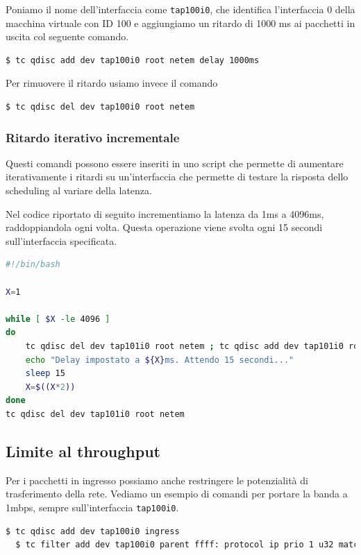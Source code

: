 \documentclass[12pt, hidelinks]{report}
\begin{document}
Poniamo il nome dell'interfaccia come \texttt{tap100i0}, che identifica l'interfaccia 0 della macchina virtuale con ID 100 e aggiungiamo un ritardo di 1000 ms ai pacchetti in uscita col seguente comando.

\begin{lstlisting}[language=bash]
  $ tc qdisc add dev tap100i0 root netem delay 1000ms
\end{lstlisting}

Per rimuovere il ritardo usiamo invece il comando

\begin{lstlisting}[language=bash]
  $ tc qdisc del dev tap100i0 root netem
\end{lstlisting}

\subsubsection{Ritardo iterativo incrementale}
Questi comandi possono essere inseriti in uno script che permette di aumentare iterativamente i ritardi su un'interfaccia che permette di testare la risposta dello scheduling al variare della latenza.

Nel codice riportato di seguito incrementiamo la latenza da 1ms a 4096ms, raddoppiandola ogni volta. Questa operazione viene svolta ogni 15 secondi sull'interfaccia specificata.

\begin{lstlisting}[language=bash]
#!/bin/bash

X=1

while [ $X -le 4096 ]
do
    tc qdisc del dev tap101i0 root netem ; tc qdisc add dev tap101i0 root netem delay ${X}ms rate 1mbit
    echo "Delay impostato a ${X}ms. Attendo 15 secondi..."
    sleep 15
    X=$((X*2))
done
tc qdisc del dev tap101i0 root netem
\end{lstlisting}

\subsection{Limite al throughput}
Per i pacchetti in ingresso possiamo anche restringere le potenzialità di trasferimento della rete. Vediamo un esempio di comandi per portare la banda a 1mbps, sempre sull'interfaccia  \texttt{tap100i0}.

\begin{lstlisting}[language=bash]
  $ tc qdisc add dev tap100i0 ingress
  $ tc filter add dev tap100i0 parent ffff: protocol ip prio 1 u32 match ip src 0.0.0.0/0 police rate 1mbit burst 10k drop flowid :1
\end{lstlisting}
\end{document}
